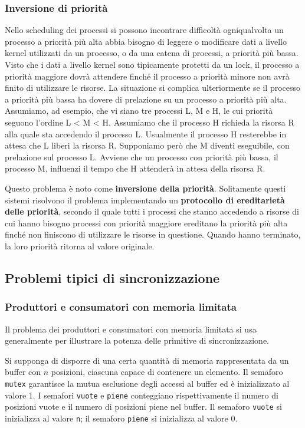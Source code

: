 \documentclass[11pt,a4paper]{article}
\begin{document}
\subsubsection{Inversione di priorità}
Nello scheduling dei processi si possono incontrare difficoltà ogniqualvolta un processo a
priorità più alta abbia bisogno di leggere o modificare dati a livello kernel utilizzati da un
processo, o da una catena di processi, a priorità più bassa. Visto che i dati a livello kernel so­no tipicamente protetti da un lock, il processo a priorità maggiore dovrà attendere finché il
processo a priorità minore non avrà finito di utilizzare le risorse. La situazione si complica
ulteriormente se il processo a priorità più bassa ha dovere di prelazione su un processo a
priorità più alta. Assumiamo, ad esempio, che vi siano tre processi L, M e H, le cui priorità
seguono l'ordine L < M < H. Assumiamo che il processo H richieda la risorsa R alla quale sta
accedendo il processo L. Usualmente il processo H resterebbe in attesa che L liberi la risorsa
R. Supponiamo però che M diventi eseguibile, con prelazione sul processo L. Avviene che un processo con priorità più bassa, il processo M, influenzi il tempo che H
attenderà in attesa della risorsa R.

Questo problema è noto come \textbf{inversione della priorità}. Solitamente questi sistemi risolvono il problema implementando un
\textbf{protocollo di ereditarietà delle priorità}, secondo il quale tutti i processi che stanno acce­dendo a risorse di cui hanno bisogno processi con priorità maggiore ereditano la priorità più
alta finché non finiscono di utilizzare le risorse in questione. Quando hanno terminato, la
loro priorità ritorna al valore originale.

\subsection{Problemi tipici di sincronizzazione}
\subsubsection{Produttori e consumatori con memoria limitata}
Il problema dei produttori e consumatori con memoria limitata si usa generalmente per illustrare la potenza delle primitive di sincronizzazione.

Si supponga di disporre di una certa quantità di memoria rappresentata da un buffer
con $n$ posizioni, ciascuna capace di contenere un elemento. Il semaforo \texttt{mutex} garantisce la
mutua esclusione degli accessi al buffer ed è inizializzato al valore 1. I semafori \texttt{vuote} e
\texttt{piene} conteggiano rispettivamente il numero di posizioni vuote e il numero di posizioni
piene nel buffer. Il semaforo \texttt{vuote} si inizializza al valore \texttt{n}; il semaforo \texttt{piene} si inizializza al valore 0.
\end{document}
